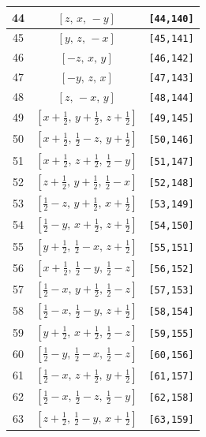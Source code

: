 \documentclass[fleqn,8pt]{jsarticle}
\begin{document}
\begin{longtable}{ccc}
44 & $\left[ z,\, x,\, - y \right]$ & {\tt [44,140]} \\ \hline
45 & $\left[ y,\, z,\, - x \right]$ & {\tt [45,141]} \\ \hline
46 & $\left[ - z,\, x,\, y \right]$ & {\tt [46,142]} \\ \hline
47 & $\left[ - y,\, z,\, x \right]$ & {\tt [47,143]} \\ \hline
48 & $\left[ z,\, - x,\, y \right]$ & {\tt [48,144]} \\ \hline
49 & $\left[ x + \frac{1}{2},\, y + \frac{1}{2},\, z + \frac{1}{2} \right]$ & {\tt [49,145]} \\ \hline
50 & $\left[ x + \frac{1}{2},\, \frac{1}{2} - z,\, y + \frac{1}{2} \right]$ & {\tt [50,146]} \\ \hline
51 & $\left[ x + \frac{1}{2},\, z + \frac{1}{2},\, \frac{1}{2} - y \right]$ & {\tt [51,147]} \\ \hline
52 & $\left[ z + \frac{1}{2},\, y + \frac{1}{2},\, \frac{1}{2} - x \right]$ & {\tt [52,148]} \\ \hline
53 & $\left[ \frac{1}{2} - z,\, y + \frac{1}{2},\, x + \frac{1}{2} \right]$ & {\tt [53,149]} \\ \hline
54 & $\left[ \frac{1}{2} - y,\, x + \frac{1}{2},\, z + \frac{1}{2} \right]$ & {\tt [54,150]} \\ \hline
55 & $\left[ y + \frac{1}{2},\, \frac{1}{2} - x,\, z + \frac{1}{2} \right]$ & {\tt [55,151]} \\ \hline
56 & $\left[ x + \frac{1}{2},\, \frac{1}{2} - y,\, \frac{1}{2} - z \right]$ & {\tt [56,152]} \\ \hline
57 & $\left[ \frac{1}{2} - x,\, y + \frac{1}{2},\, \frac{1}{2} - z \right]$ & {\tt [57,153]} \\ \hline
58 & $\left[ \frac{1}{2} - x,\, \frac{1}{2} - y,\, z + \frac{1}{2} \right]$ & {\tt [58,154]} \\ \hline
59 & $\left[ y + \frac{1}{2},\, x + \frac{1}{2},\, \frac{1}{2} - z \right]$ & {\tt [59,155]} \\ \hline
60 & $\left[ \frac{1}{2} - y,\, \frac{1}{2} - x,\, \frac{1}{2} - z \right]$ & {\tt [60,156]} \\ \hline
61 & $\left[ \frac{1}{2} - x,\, z + \frac{1}{2},\, y + \frac{1}{2} \right]$ & {\tt [61,157]} \\ \hline
62 & $\left[ \frac{1}{2} - x,\, \frac{1}{2} - z,\, \frac{1}{2} - y \right]$ & {\tt [62,158]} \\ \hline
63 & $\left[ z + \frac{1}{2},\, \frac{1}{2} - y,\, x + \frac{1}{2} \right]$ & {\tt [63,159]} \\ \hline

\end{longtable}
\end{document}
